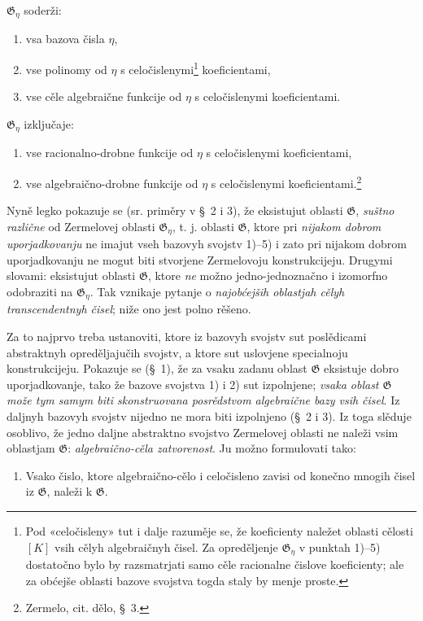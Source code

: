 \documentclass[11pt]{article}
\begin{document}
$\mathfrak G_\eta$ soderži:
\begin{enumerate}
\item[1)] vsa bazova čisla $\eta$,
\item[2)] vse polinomy od $\eta$ s celočislenymi\footnote{Pod «celočisleny» tut i dalje razuměje se, že koeficienty naležet oblasti cělosti $[K]$ vsih cělyh algebraičnyh čisel. Za opreděljenje $\mathfrak G_\eta$ v punktah 1)--5) dostatočno bylo by razsmatrjati samo cěle racionalne čislove koeficienty; ale za obćejše oblasti bazove svojstva togda staly by menje proste.} koeficientami,
\item[3)] vse cěle algebraične funkcije od $\eta$ s celočislenymi koeficientami.
\end{enumerate}
$\mathfrak G_\eta$ izključaje:
\begin{enumerate}
\item[4)] vse racionalno-drobne funkcije od $\eta$ s celočislenymi koeficientami,
\item[5)] vse algebraično-drobne funkcije od $\eta$ s celočislenymi koeficientami.\footnote{Zermelo, cit. dělo, \S\ 3.}
\end{enumerate}

Nyně legko pokazuje se (sr. priměry v \S\ 2 i 3), že eksistujut oblasti $\mathfrak G$, {\itshape suštno različne} od Zermelovej oblasti $\mathfrak G_\eta$, t. j. oblasti $\mathfrak G$, ktore pri {\itshape nijakom dobrom uporjadkovanju} ne imajut vseh bazovyh svojstv 1)--5) i zato pri nijakom dobrom uporjadkovanju ne mogut biti stvorjene Zermelovoju konstrukcijeju. Drugymi slovami: eksistujut oblasti $\mathfrak G$, ktore {\itshape ne} možno jedno-jednoznačno i izomorfno odobraziti na $\mathfrak G_\eta$. Tak vznikaje pytanje o {\itshape najobćejših oblastjah cělyh transcendentnyh čisel}; niže ono jest polno rěšeno.

Za to najprvo treba ustanoviti, ktore iz bazovyh svojstv sut poslědicami abstraktnyh opreděljajučih svojstv, a ktore sut uslovjene specialnoju konstrukcijeju. Pokazuje se (\S\ 1), že za vsaku zadanu oblast $\mathfrak G$ eksistuje dobro uporjadkovanje, tako že bazove svojstva 1) i 2) sut izpolnjene; {\itshape vsaka oblast $\mathfrak G$ može tym samym biti skonstruovana posrědstvom algebraične bazy vsih čisel}. Iz daljnyh bazovyh svojstv nijedno ne mora biti izpolnjeno (\S\ 2 i 3). Iz toga slěduje osoblivo, že jedno daljne abstraktno svojstvo Zermelovej oblasti ne naleži vsim oblastjam $\mathfrak G$: {\itshape algebraično-cěla zatvorenost}. Ju možno formulovati tako:
\begin{enumerate}
\item[V.] Vsako čislo, ktore algebraično-cělo i celočisleno zavisi od konečno mnogih čisel iz $\mathfrak G$, naleži k $\mathfrak G$.
\end{enumerate}
\end{document}
